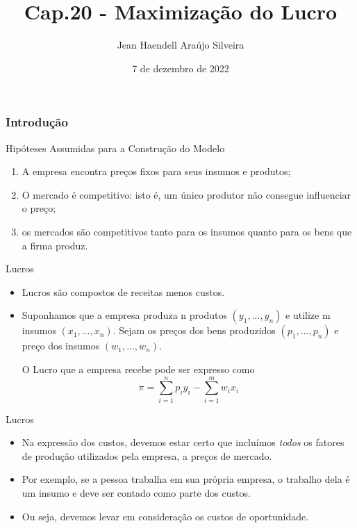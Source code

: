 \documentclass[aspectratio=169]{beamer}
\title{Cap.20 - Maximização do Lucro}
\author[Jean Haendell]{Jean Haendell Araújo Silveira}
\institute[UFC]{Universidade Federal do Ceará}
\date{7 de dezembro de 2022}
\begin{document}
\frame{\titlepage}

\begin{frame}
\frametitle{Introdução}
\begin{block}{Hipóteses Assumidas para a Construção do Modelo}
\begin{enumerate}
    \item A empresa encontra preços fixos para seus insumos e produtos;
    \item O mercado é \alert{competitivo}: isto é, um único produtor não consegue influenciar o preço;
    \item os mercados são competitivos tanto para os insumos quanto para os bens que a firma produz.
\end{enumerate}

    
\end{block}


\end{frame}

\begin{frame}{Lucros}

\begin{block}{ }

\begin{itemize}
    \item \alert{Lucros} são compostos de receitas menos custos.
    \item Suponhamos que a empresa produza n produtos $(y_1,...,y_n)$ e utilize m insumos $(x_1, ..., x_n)$. Sejam os preços dos bens produzidos $(p_1,...,p_n)$ e preço dos insumos $(w_1,...,w_n)$.

      O Lucro que a empresa recebe pode ser expresso como
    $$\pi = \sum_{i = 1}^{n} p_i y_i - \sum_{i = 1}^{m} w_i x_i $$
\end{itemize}


\end{block}
\end{frame}

\begin{frame}{Lucros}

\begin{block}{ }

\begin{itemize}
    \item Na expressão dos custos, devemos estar certo que incluímos \textit{todos} os fatores de produção utilizados pela empresa, a preços de mercado.
    \item Por exemplo, se a pessoa trabalha em sua própria empresa, o trabalho dela é um insumo e deve ser contado como parte dos custos.
    \item Ou seja, devemos levar em consideração os \alert{custos de oportunidade}.

\end{itemize}

\end{block}
\end{frame}
\end{document}
